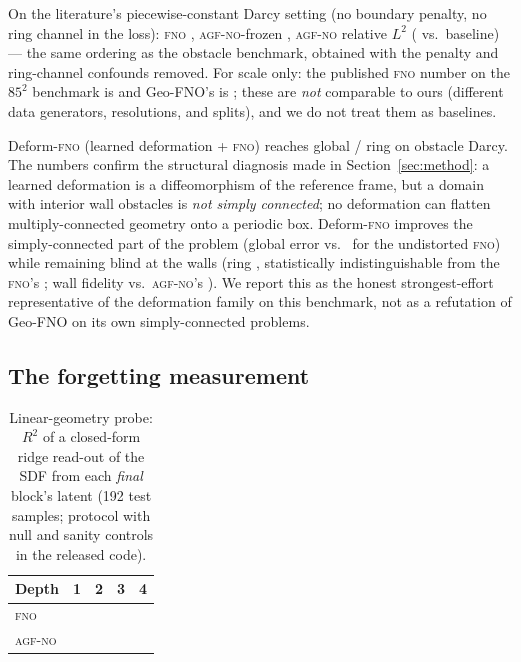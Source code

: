 \documentclass[11pt]{article}
\theoremstyle{definition}
\newcommand{\fno}{\textsc{fno}}
\newcommand{\agfno}{\textsc{agf-no}}
\newcommand{\Rtwo}{R^2}
\begin{document}
On the literature's piecewise-constant Darcy setting (no boundary penalty,
no ring channel in the loss):
\fno{} \BenchFnoRelL, \agfno{}-frozen \BenchFrozenRelL, \agfno{}
\textbf{\BenchAgfRelL} relative $L^2$ (\BenchAgfVsFnoRed{} vs.\ baseline)---
the same ordering as the obstacle benchmark, obtained with the penalty and
ring-channel confounds removed. For scale only: the published \fno{} number
on the $85^2$ benchmark is \PubFnoDarcy{} and Geo-FNO's is \PubGeoFnoDarcy{}
\citep{li2021fno, mao2023geofno}; these are \emph{not} comparable to ours
(different data generators, resolutions, and splits), and we do not treat
them as baselines.

Deform-\fno{} (learned deformation + \fno{}) reaches \GeofnoRelL{} global /
\GeofnoRing{} ring on obstacle Darcy. The numbers confirm the structural
diagnosis made in Section~\ref{sec:method}: a learned deformation is a
diffeomorphism of the reference frame, but a domain with interior wall
obstacles is \emph{not simply connected}; no deformation can flatten
multiply-connected geometry onto a periodic box. Deform-\fno{} improves the
simply-connected part of the problem (global error \GeofnoRelL{} vs.\
\ExpFnoRelL{} for the undistorted \fno{}) while remaining blind at the
walls (ring \GeofnoRing{}, statistically indistinguishable from the \fno{}'s
\ExpFnoRing{}; wall fidelity \GeofnoWall{} vs.\ \agfno{}'s \ExpAgfWall).
We report this as the honest strongest-effort representative of the
deformation family on this benchmark, not as a refutation of Geo-FNO on its
own simply-connected problems.

\subsection{The forgetting measurement}
\label{sec:probe}

\begin{table}[t]
\centering\small
\caption{Linear-geometry probe: $\Rtwo$ of a closed-form ridge read-out of
the SDF from each \emph{final} block's latent (192 test samples; protocol
with null and sanity controls in the released code).}
\label{tab:probe}
\begin{tabular}{lcccc}
\toprule
Depth & 1 & 2 & 3 & 4 \\
\midrule
\fno{}   & \ProbeFnoDOne & \ProbeFnoDTwo & \ProbeFnoDThree & \ProbeFnoDFour \\
\agfno{} & \ProbeAgfDOne & \ProbeAgfDTwo & \ProbeAgfDThree & \ProbeAgfDFour \\
\bottomrule
\end{tabular}
\end{table}
\end{document}
